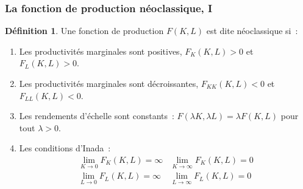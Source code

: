 \documentclass[10pt,notheorems]{beamer}
\theoremstyle{plain}
\theoremstyle{definition} %
\newtheorem{definition}{Définition}
\begin{document}
\begin{frame}
  \frametitle{La fonction de production néoclassique, I}


  \begin{definition}
    Une fonction de production $F(K,L)$ est dite néoclassique si~:
    \medskip
    \begin{enumerate}

    \item Les productivités marginales sont positives, $F_K(K,L)>0$ et $F_L(K,L)>0$.\newline

    \item Les productivités marginales sont décroissantes, $F_{KK}(K,L)<0$ et $F_{LL}(K,L)<0$.\newline

    \item Les rendements d'échelle sont constants~: $F(\lambda K, \lambda L) = \lambda F(K,L)$ pour tout $\lambda>0$.\newline

    \item Les conditions d'Inada~:
      \[
        \begin{split}
          \lim_{K\rightarrow 0}F_K(K,L) = \infty & \lim_{K\rightarrow \infty}F_K(K,L) = 0 \\
          \lim_{L\rightarrow 0}F_L(K,L) = \infty & \lim_{L\rightarrow \infty}F_L(K,L) = 0
        \end{split}
      \]

    \end{enumerate}
  \end{definition}

\end{frame}
\end{document}
